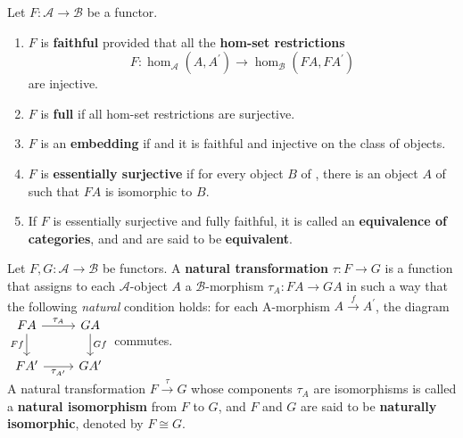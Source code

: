 Let $F: \mathcal{A} \rightarrow \mathcal{B}$ be a functor.
\begin{enumerate}
    \item $F$ is \textbf{faithful} provided that all the \textbf{hom-set restrictions}
    $$
    F: \operatorname{hom}_{\mathcal{A}}\left(A, A^{\prime}\right) \rightarrow \operatorname{hom}_{\mathcal{B}}\left(F A, F A^{\prime}\right)
    $$
    are injective.
    \item $F$ is \textbf{full} if all hom-set restrictions are surjective.
    \item $F$ is an \textbf{embedding} if and it is faithful and injective on the class of objects.
    \item $F$ is \textbf{essentially surjective} if for every object $B$ of \cb, there is an object $A$ of \ca such that $F A$ is isomorphic to $B$. 
    \item If $F$ is essentially surjective and fully faithful, it is called an \textbf{equivalence of categories}, and \ca and \cb are said to be \textbf{equivalent}.
\end{enumerate}

Let $F, G: \mathcal{A} \rightarrow \mathcal{B}$ be functors. A \textbf{natural transformation} $\tau: F \rightarrow G$ is a function that assigns to each $\mathcal{A}$-object $A$ a $\mathcal{B}$-morphism $\tau_A: F A \rightarrow G A$ in such a way that the following \textit{natural} condition holds: for each A-morphism $A \xrightarrow{f} A^{\prime}$, the diagram
$
\begin{tikzcd}
FA \arrow[r, "\tau_A"] \arrow[d, "Ff"'] & GA \arrow[d, "Gf"] \\
FA' \arrow[r, "\tau_{A'}"'] & GA'
\end{tikzcd}
$ commutes.\\
A natural transformation $F \xrightarrow{\tau} G$ whose components $\tau_A$ are isomorphisms is called a \textbf{natural isomorphism} from $F$ to $G$, and $F$ and $G$ are said to be \textbf{naturally isomorphic}, denoted by $F \cong G$.

